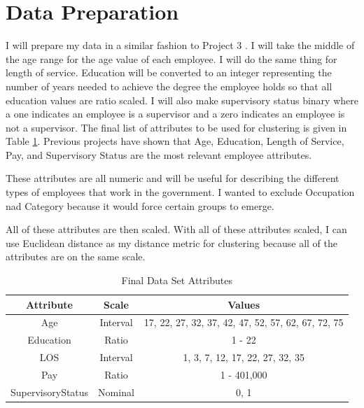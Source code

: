 \documentclass{article}
\begin{document}
\section{Data Preparation}
I will prepare my data in a similar fashion to Project 3 \cite{proj3}. I will take the middle of the age range for the age value of each employee. I will do the same thing for length of service. Education will be converted to an integer representing the number of years needed to achieve the degree the employee holds so that all education values are ratio scaled. I will also make supervisory status binary where a one indicates an employee is a supervisor and a zero indicates an employee is not a supervisor. The final list of attributes to be used for clustering is given in Table \ref{tab:1}. Previous projects have shown that Age, Education, Length of Service, Pay, and Supervisory Status are the most relevant employee attributes.
\par
These attributes are all numeric and will be useful for describing the different types of employees that work in the government. I wanted to exclude Occupation nad Category because it would force certain groups to emerge.
\par
All of these attributes are then scaled. With all of these attributes scaled, I can use Euclidean distance as my distance metric for clustering because all of the attributes are on the same scale.

    \begin{center}
        \begin{table}
            \centering
            \begin{tabular}{ |c|c|c| }
                \hline
                Attribute & Scale & Values \\
                \hline
                Age & Interval & 17, 22, 27, 32, 37, 42, 47, 52, 57, 62, 67, 72, 75 \\
                Education & Ratio & 1 - 22 \\
                LOS & Interval & 1, 3, 7, 12, 17, 22, 27, 32, 35 \\
                Pay & Ratio & 1 - 401,000 \\
                SupervisoryStatus & Nominal & 0, 1 \\
                \hline
            \end{tabular}
            \caption{Final Data Set Attributes}
            \label{tab:1}
        \end{table}
    \end{center}
\end{document}
